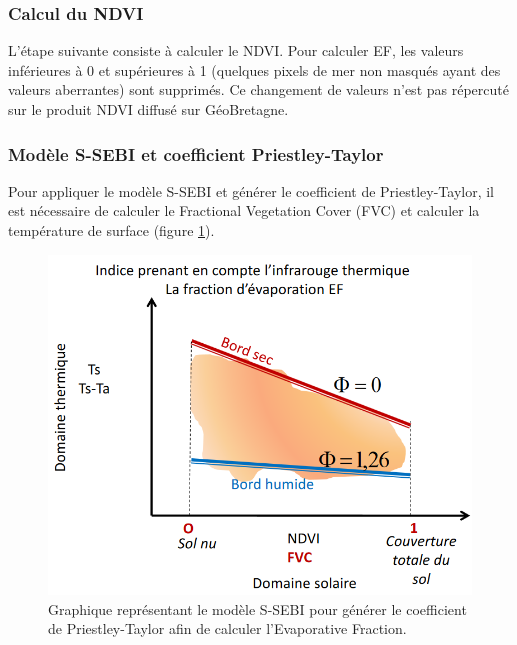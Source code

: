\documentclass[10pt,a4paper]{article}
\begin{document}
\subsubsection{Calcul du NDVI}

L'étape suivante consiste à calculer le NDVI. Pour calculer EF, les valeurs inférieures à 0 et supérieures à 1 (quelques pixels de mer non masqués ayant des valeurs aberrantes) sont supprimés. Ce changement de valeurs n'est pas répercuté sur le produit NDVI diffusé sur GéoBretagne.

\subsubsection{Modèle S-SEBI et coefficient Priestley-Taylor}

Pour appliquer le modèle S-SEBI et générer le coefficient de Priestley-Taylor, il est nécessaire de calculer le Fractional Vegetation Cover (FVC) et calculer la température de surface (figure \ref{graphFVCTemp}).

\begin{figure}[!h]
\centering
\includegraphics[scale=0.35]{img/graph_fvc_temp.png}
\caption{Graphique représentant le modèle S-SEBI pour générer le coefficient de Priestley-Taylor afin de calculer l'Evaporative Fraction.}
\label{graphFVCTemp}
\end{figure}
\end{document}
